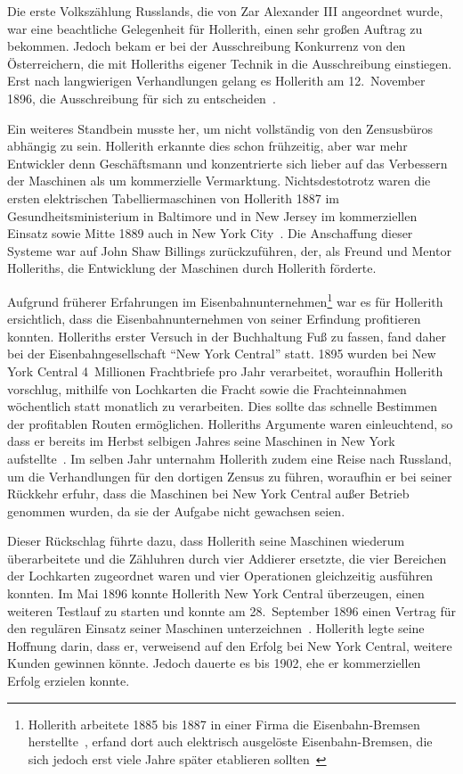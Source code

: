 \documentclass[parskip=half]{scrartcl}
\begin{document}
Die erste Volkszählung Russlands, die von Zar Alexander III angeordnet wurde, war
eine beachtliche Gelegenheit für Hollerith, einen sehr großen Auftrag zu
bekommen. Jedoch bekam er bei der Ausschreibung Konkurrenz von den
Österreichern, die mit Holleriths eigener Technik in die Ausschreibung
einstiegen. Erst nach langwierigen Verhandlungen gelang es Hollerith am
12.~November 1896, die Ausschreibung für sich zu entscheiden~\cite{austrian1982herman}.

Ein weiteres Standbein musste her, um nicht vollständig von den Zensusbüros
abhängig zu sein. Hollerith erkannte dies schon frühzeitig, aber war mehr
Entwickler denn Geschäftsmann und konzentrierte sich lieber auf das Verbessern
der Maschinen als um kommerzielle Vermarktung. Nichtsdestotrotz waren die
ersten elektrischen Tabelliermaschinen von Hollerith 1887 im
Gesundheitsministerium in Baltimore und in New Jersey im kommerziellen Einsatz
sowie Mitte 1889 auch in New York City~\cite{austrian1982herman}. Die
Anschaffung dieser Systeme war auf John Shaw Billings zurückzuführen, der, als
Freund und Mentor Holleriths, die Entwicklung der Maschinen durch Hollerith
förderte.

Aufgrund früherer Erfahrungen im Eisenbahnunternehmen\footnote{Hollerith
arbeitete 1885 bis 1887 in einer Firma die Eisenbahn-Bremsen
herstellte~\cite{heide2009punched}, erfand dort auch elektrisch
ausgelöste Eisenbahn-Bremsen, die sich jedoch erst viele Jahre später
etablieren sollten~\cite{austrian1982herman}} war es für Hollerith ersichtlich,
dass die Eisenbahnunternehmen von seiner Erfindung profitieren konnten.
Holleriths erster Versuch in der Buchhaltung Fuß zu fassen, fand daher bei der
Eisenbahngesellschaft \enquote{New York Central} statt. 1895 wurden bei New
York Central 4~Millionen Frachtbriefe pro Jahr verarbeitet, woraufhin Hollerith
vorschlug, mithilfe von Lochkarten die Fracht sowie die Frachteinnahmen
wöchentlich statt monatlich zu verarbeiten. Dies sollte das schnelle Bestimmen
der profitablen Routen ermöglichen. Holleriths Argumente waren einleuchtend, so
dass er bereits im Herbst selbigen Jahres seine Maschinen in New York
aufstellte~\cite{austrian1982herman}. Im selben Jahr unternahm Hollerith zudem
eine Reise nach Russland, um die Verhandlungen für den dortigen Zensus zu
führen, woraufhin er bei seiner Rückkehr erfuhr, dass die Maschinen bei New
York Central außer Betrieb genommen wurden, da sie der Aufgabe nicht gewachsen
seien.

Dieser Rückschlag führte dazu, dass Hollerith seine Maschinen wiederum
überarbeitete und die Zähluhren durch vier Addierer ersetzte, die vier
Bereichen der Lochkarten zugeordnet waren und vier Operationen gleichzeitig
ausführen konnten. Im Mai 1896 konnte Hollerith New York Central überzeugen,
einen weiteren Testlauf zu starten und konnte am 28.~September 1896 einen
Vertrag für den regulären Einsatz seiner Maschinen
unterzeichnen~\cite{austrian1982herman}. Hollerith legte seine Hoffnung darin,
dass er, verweisend auf den Erfolg bei New York Central, weitere Kunden
gewinnen könnte. Jedoch dauerte es bis 1902, ehe er kommerziellen Erfolg
erzielen konnte.
\end{document}
